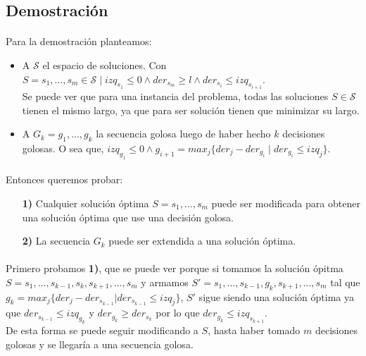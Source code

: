 \documentclass[./main.tex]{subfiles}
\begin{document}
\subsection{Demostración}
\label{sec:ej2-dem}

\paragraph{} Para la demostración planteamos:
\begin{itemize}
  \item A \(\mathcal{S}\) el espacio de soluciones. Con \(S = s_1, \ldots, s_m \in \mathcal{S} \mid izq_{s_1} \leq 0 \land der_{s_m} \geq l \land der_{s_i} \leq izq_{s_{i+1}}\). \\
  Se puede ver que para una instancia del problema, todas las soluciones \(S \in \mathcal{S}\) tienen el mismo largo, ya que para ser solución tienen que minimizar su largo. 
  \item A \(G_k = g_1, \ldots, g_k\) la secuencia golosa luego de haber hecho \(k\) decisiones golosas. O sea que, \(izq_{g_1} \leq 0 \land g_{i+1} = max_j\{der_j - der_{g_i} \mid der_{g_i} \leq izq_j\}\).
\end{itemize}

\paragraph{} Entonces queremos probar: \begin{itemize}
  \item[\textbf{1)}] Cualquier solución óptima \(S = s_1, \ldots, s_m\) puede ser modificada para obtener una solución óptima que use una decisión golosa.
  \item[\textbf{2)}] La secuencia \(G_k\) puede ser extendida a una solución óptima.
\end{itemize}

\paragraph{} Primero probamos \textbf{1)}, que se puede ver porque si tomamos la solución ópitma \(S = s_1, \ldots, s_{k-1}, s_k, s_{k+1}, \ldots, s_m\) y armamos \(S' = s_1, \ldots, s_{k-1}, g_k, s_{k+1}, \ldots, s_m\) tal que \(g_k = max_j\{der_j - der_{s_{k-1}} | der_{s_{k-1}} \leq izq_j\}\), \(S'\) sigue siendo una solución óptima ya que \(der_{s_{k-1}} \leq izq_{g_k}\) y \(der_{g_k} \geq der_{s_k}\) por lo que \(der_{g_k} \leq izq_{s_{k+1}}\). \\
De esta forma se puede seguir modificando a \(S\), hasta haber tomado \(m\) decisiones golosas y se llegaría a una secuencia golosa.
\end{document}
